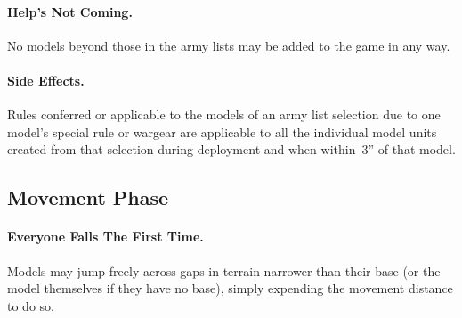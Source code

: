 
\paragraph{Help's Not Coming.}  No models beyond those in the army
lists may be added to the game in any way.

\paragraph{Side Effects.}  Rules conferred or applicable to the models
of an army list selection due to one model's special rule or wargear
are applicable to all the individual model units created from that
selection during deployment and when within~3'' of that model.




\subsection{Movement Phase}

\paragraph{Everyone Falls The First Time.}
Models may jump freely across gaps in terrain narrower than their base
(or the model themselves if they have no base), simply expending the
movement distance to do so.

